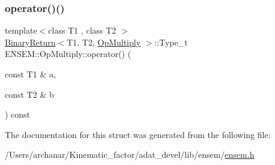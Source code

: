 \mbox{\label{structENSEM_1_1OpMultiply_ae4e6438a01cae970041fa80c1cb6b594}} 
\subsubsection{\texorpdfstring{operator()()}{operator()()}\hspace{0.1cm}{\footnotesize\ttfamily [2/2]}}
{\footnotesize\ttfamily template$<$class T1 , class T2 $>$ \\
\mbox{\hyperlink{structENSEM_1_1BinaryReturn}{Binary\+Return}}$<$T1, T2, \mbox{\hyperlink{structENSEM_1_1OpMultiply}{Op\+Multiply}} $>$\+::Type\+\_\+t E\+N\+S\+E\+M\+::\+Op\+Multiply\+::operator() (\begin{DoxyParamCaption}\item[{const T1 \&}]{a,  }\item[{const T2 \&}]{b }\end{DoxyParamCaption}) const\hspace{0.3cm}{\ttfamily [inline]}}



The documentation for this struct was generated from the following file\+:\begin{DoxyCompactItemize}
\item 
/\+Users/archanar/\+Kinematic\+\_\+factor/adat\+\_\+devel/lib/ensem/\mbox{\hyperlink{lib_2ensem_2ensem_8h}{ensem.\+h}}\end{DoxyCompactItemize}
